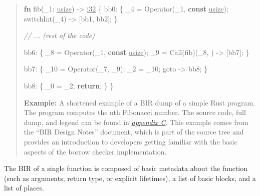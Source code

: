 \documentclass[
  11pt,
  twoside,symmetric]{report}
\newenvironment{Shaded}{}{}
\newcommand{\CommentTok}[1]{\textit{#1}}
\newcommand{\ControlFlowTok}[1]{\textbf{#1}}
\newcommand{\DataTypeTok}[1]{\underline{#1}}
\newcommand{\KeywordTok}[1]{\textbf{#1}}
\newcommand{\NormalTok}[1]{#1}
\newcommand{\OperatorTok}[1]{#1}
\begin{document}
\begin{quote}
\begin{Shaded}
\begin{Highlighting}[]
\KeywordTok{fn}\NormalTok{ fib(\_1}\OperatorTok{:} \DataTypeTok{usize}\NormalTok{) }\OperatorTok{{-}\textgreater{}} \DataTypeTok{i32} \OperatorTok{\{}
\NormalTok{    bb0}\OperatorTok{:} \OperatorTok{\{}
\NormalTok{        \_4 }\OperatorTok{=}\NormalTok{ Operator(\_1}\OperatorTok{,} \KeywordTok{const} \DataTypeTok{usize}\NormalTok{)}\OperatorTok{;}
\NormalTok{        switchInt(\_4) }\OperatorTok{{-}\textgreater{}}\NormalTok{ [bb1}\OperatorTok{,}\NormalTok{ bb2]}\OperatorTok{;}
    \OperatorTok{\}}

    \CommentTok{// ... (rest of the code)}

\NormalTok{    bb6}\OperatorTok{:} \OperatorTok{\{}
\NormalTok{        \_8 }\OperatorTok{=}\NormalTok{ Operator(\_1}\OperatorTok{,} \KeywordTok{const} \DataTypeTok{usize}\NormalTok{)}\OperatorTok{;}
\NormalTok{        \_9 }\OperatorTok{=}\NormalTok{ Call(fib)(\_8}\OperatorTok{,}\NormalTok{ ) }\OperatorTok{{-}\textgreater{}}\NormalTok{ [bb7]}\OperatorTok{;}
    \OperatorTok{\}}

\NormalTok{    bb7}\OperatorTok{:} \OperatorTok{\{}
\NormalTok{        \_10 }\OperatorTok{=}\NormalTok{ Operator(\_7}\OperatorTok{,}\NormalTok{ \_9)}\OperatorTok{;}
\NormalTok{        \_2 }\OperatorTok{=}\NormalTok{ \_10}\OperatorTok{;}
\NormalTok{        goto }\OperatorTok{{-}\textgreater{}}\NormalTok{ bb8}\OperatorTok{;}
    \OperatorTok{\}}

\NormalTok{    bb8}\OperatorTok{:} \OperatorTok{\{}
\NormalTok{        \_0 }\OperatorTok{=}\NormalTok{ \_2}\OperatorTok{;}
        \ControlFlowTok{return}\OperatorTok{;}
    \OperatorTok{\}}
\OperatorTok{\}}
\end{Highlighting}
\end{Shaded}

\textbf{Example:} A shortened example of a BIR dump of a simple Rust
program. The program computes the nth Fibonacci number. The source code,
full dump, and legend can be found in
\hyperref[appendix-c-bir-dump-example]{\emph{appendix C}}. This example
comes from the ``BIR Design Notes'' document, which is part of the
source tree and provides an introduction to developers getting familiar
with the basic aspects of the borrow checker implementation.
\end{quote}

The BIR of a single function is composed of basic metadata about the
function (such as arguments, return type, or explicit lifetimes), a list
of basic blocks, and a list of places.
\end{document}
